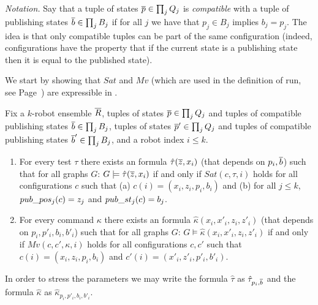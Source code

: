 \emph{Notation.} 
Say that a tuple of states $\overline{p} \in \prod_j Q_j$ is \emph{compatible} with a tuple of publishing states 
$\overline{b} \in \prod_j B_j$ if for all $j$ we have that $p_j \in B_j$ implies $b_j = p_j$. The idea is that only compatible tuples can be part 
of the same configuration (indeed, configurations have the property that if the current state is a publishing state then 
it is equal to the published state).

We start by showing that $Sat$ and $Mv$ (which are used in the definition of run, see Page~\pageref{def:sat}) are expressible in \msol.

\iffalse
{}

\begin{lemma} \label{lem:hat-transforms}
Fix a $k$-robot ensemble $\overline{R}$, tuples of states $\overline{p} \in \prod_j Q_j$ and tuples of compatible publishing states 
$\overline{b} \in \prod_j B_j$, 
tuples of states $\overline{p}' \in \prod_j Q_j$ and tuples of compatible publishing states 
$\overline{b}' \in \prod_j B_j$, and a robot index $i \leq k$. 


\begin{enumerate}
  \item For every test $\tau$ there exists an \msol formula $\hat{\tau}(\overline{z},x_i)$ (that depends on $p_i,\overline{b}$) such that for all graphs $G$: 
  $G \models \hat{\tau}(\overline{z},x_i)$ if and only if $Sat(c,\tau,i)$ holds for all configurations $c$ such that (a) $c(i) = (x_i,z_i,p_i,b_i)$ and 
  (b) for all $j \leq k$, $pub\_pos_j(c) = z_j$ and $pub\_st_j(c) = b_j$. 
  
  
  
 \item For every command $\kappa$ there exists an \msol formula $\hat{\kappa}(x_i,x'_i,z_i,z'_i)$ (that depends on $p_i,p'_i,b_i,b'_i$) 
 such that for all graphs $G$: $G \models \hat{\kappa}(x_i,x'_i,z_i,z'_i)$ if and only if  $Mv(c,c',\kappa,i)$ holds for all configurations $c,c'$ such that 
 $c(i) = (x_i,z_i,p_i,b_i)$ and $c'(i) = (x'_i,z'_i,p'_i,b'_i)$.

 
 \end{enumerate}
 In order to stress the parameters we may write the formula $\hat{\tau}$ as $\hat{\tau}_{p_i,\overline{b}}$ and the formula
 $\hat{\kappa}$ as $\hat{\kappa}_{p_i,p'_i,b_i,b'_i}$.
\end{lemma}

